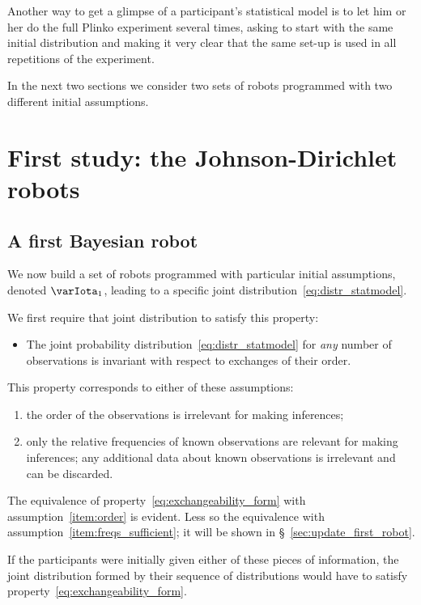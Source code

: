 \documentclass[\ifafour a4paper,12pt,\else a5paper,10pt,\fi%
onecolumn,oneside,article,%
british%
]{memoir}
\theoremstyle{remark}
\theoremstyle{innote}
\renewcommand*{\|}{\mathpunct{|}}
\newcommand*{\sect}{\S}%
\newcommand*{\yI}{\varIota}
\newcommand*{\yMJ}{\yI_1}
\begin{document}
Another way to get a glimpse of a participant's statistical model is to let
him or her do the full Plinko experiment several times, asking to start
with the same initial distribution and making it very clear that the same
set-up is used in all repetitions of the experiment.

In the next two sections we consider two sets of robots programmed with two
different initial assumptions.

\section{First study: the Johnson-Dirichlet robots}
\label{sec:first_study}

\subsection{A first Bayesian robot}
\label{sec:bayes_robot}

We now build a set of robots programmed with particular initial
assumptions, denoted $\yMJ$, leading to a specific joint
distribution~\eqref{eq:distr_statmodel}.

We first require that joint distribution to satisfy this property:
\begin{itemize}
\item The joint probability distribution~\eqref{eq:distr_statmodel} for
  \emph{any} number of observations is invariant with respect to exchanges
  of their order.
\end{itemize}
This property corresponds to either of these assumptions:
\begin{enumerate}[label=(\textit{\alph*})]
\item\label{item:order}the order of the observations is irrelevant for
  making inferences;
\item\label{item:freqs_sufficient}only the relative frequencies of known
  observations are relevant for making inferences; any additional data
  about known observations is irrelevant and can be discarded.
\end{enumerate}
The equivalence of property~\eqref{eq:exchangeability_form} with
assumption~\ref{item:order} is evident. Less so the equivalence with
assumption~\ref{item:freqs_sufficient}; it will be shown in
\sect~\ref{sec:update_first_robot}.

If the participants were initially given either of these pieces of
information, the joint distribution formed by their sequence of
distributions would have to satisfy
property~\eqref{eq:exchangeability_form}.
\end{document}
